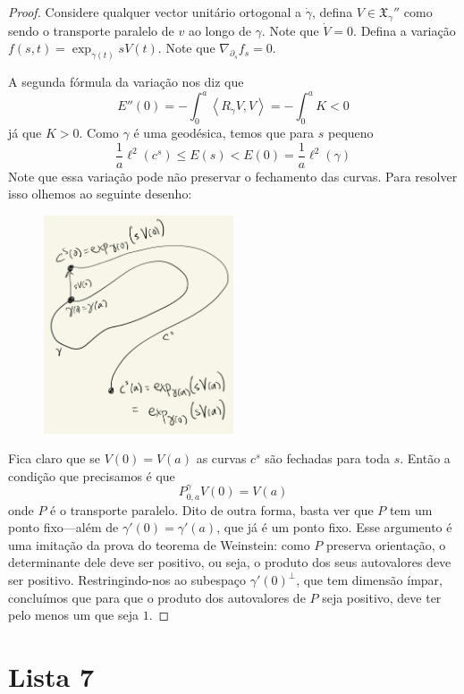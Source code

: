 \begin{proof}
Considere qualquer vector unitário ortogonal a $\dot \gamma$, defina $V\in
\mathfrak{X}_{\gamma}''$ como sendo o transporte paralelo de $v$ ao longo de
$\gamma$. Note que $\dot V=0$. Defina a variação
$f(s,t)=\operatorname{exp}_{\gamma(t)}sV(t)$. Note que
$\nabla_{\partial_s}f_s=0$.

A segunda fórmula da variação nos diz que \[E''(0)=-\int_0^a \left<R_{\dot
\gamma}V,V\right>=-\int_0^a K<0\] já que $K>0$. Como $\gamma$ é uma geodésica,
temos que para $s$ pequeno \[\frac{1}{a}\ell^2(c^s)\leq E(s) < E(0)=
\frac{1}{a}\ell^2(\gamma)\] Note que essa variação pode não preservar o
fechamento das curvas. Para resolver isso olhemos ao seguinte desenho:
\begin{figure}[H]
\centering
\includegraphics[width=0.5\textwidth]{figures/free-homotopy-variation}
\end{figure}
Fica claro que se $V(0)=V(a)$ as curvas $c^s$ são fechadas para toda $s$. Então
a condição que precisamos é que \[P^\gamma_{0,a}V(0)=V(a)\] onde $P$ é o
transporte paralelo. Dito de outra forma, basta ver que $P$ tem um ponto
fixo---além de $\gamma'(0)=\gamma'(a)$, que já é um ponto fixo. Esse argumento é
uma imitação da prova do teorema de Weinstein: como $P$ preserva orientação, o
determinante dele deve ser positivo, ou seja, o produto dos seus autovalores
deve ser positivo. Restringindo-nos ao subespaço $\gamma'(0)^\perp$, que tem
dimensão ímpar, concluímos que para que o produto dos autovalores de $P$ seja
positivo, deve ter pelo menos um que seja $1$.
\end{proof}

\section{Lista 7}
\label{section-lista-7}

